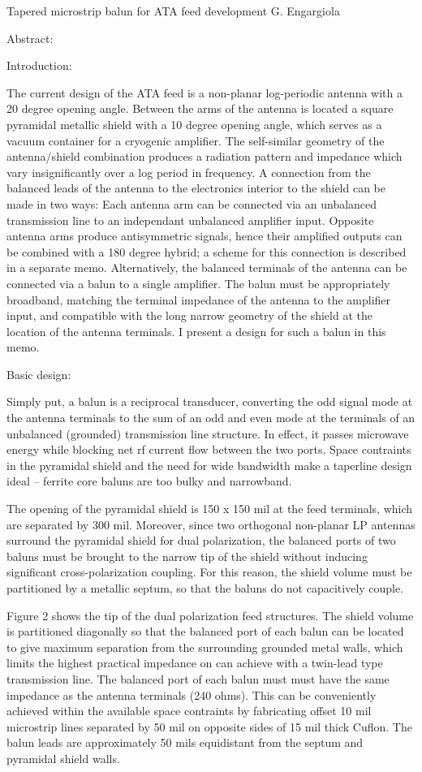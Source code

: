 Tapered microstrip balun for ATA feed development
G. Engargiola

Abstract:

Introduction:

The current design of the ATA feed is a non-planar
log-periodic antenna with a 20 degree opening angle. Between the
arms of the antenna is located a square pyramidal metallic shield
with a 10 degree opening angle, which serves as a vacuum container 
for a cryogenic amplifier. The self-similar geometry of
the antenna/shield combination produces a radiation pattern and
impedance which vary insignificantly over a log period in
frequency. A connection from the balanced leads of the antenna
to the electronics interior to the shield can be made in two ways:
Each antenna arm can be connected via an unbalanced transmission
line to an independant unbalanced amplifier input. Opposite antenna
arms produce antisymmetric signals, hence their amplified outputs
can be combined with a 180 degree hybrid; a scheme for this connection
is described in a separate memo. Alternatively, the balanced terminals
of the antenna can be connected via a balun to a single amplifier.
The balun must be appropriately broadband, matching the terminal
impedance of the antenna to the amplifier input, and compatible with
the long narrow geometry of the shield at the location of the
antenna terminals. I present a design for such a balun in this memo.

Basic design:

Simply put, a balun is a reciprocal transducer, converting the odd signal
mode at the antenna terminals to the sum of an odd and even mode 
at the terminals of an unbalanced (grounded) transmission line structure.
In effect, it passes microwave energy while blocking net rf current
flow between the two ports. Space contraints in the pyramidal
shield and the need for wide bandwidth make a taperline design ideal --
ferrite core baluns are too bulky and narrowband.

The opening of the pyramidal shield is 150 x 150 mil at the feed terminals,
which are separated by 300 mil. Moreover, since two orthogonal non-planar
LP antennas surround the pyramidal shield for dual polarization,
the balanced ports of two baluns must be brought to the narrow tip of
the shield without inducing significant cross-polarization coupling. For this
reason, the shield volume must be partitioned by a metallic septum,
so that the baluns do not capacitively couple.

Figure 2 shows the tip of the dual polarization feed structures.
The shield volume is partitioned diagonally so that the balanced
port of each balun can be located to give maximum separation from
the surrounding grounded metal walls, which limits the highest
practical impedance on can achieve with a twin-lead type
transmission line. The balanced port of each balun must
must have the same impedance as the antenna terminals (240 ohms).
This can be conveniently achieved within the available space contraints
by fabricating offset 10 mil microstrip lines separated by 50 mil
on opposite sides of 15 mil thick Cuflon.
The balun leads are approximately 50 mils equidistant from the
septum and pyramidal
shield walls.

